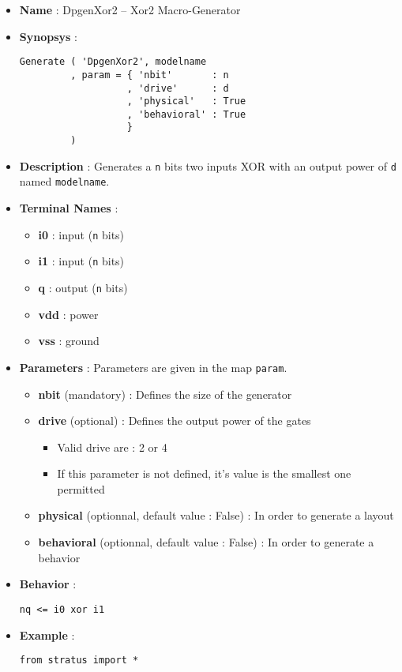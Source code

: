 \begin{itemize}
    \item \textbf{Name} : DpgenXor2 -- Xor2 Macro-Generator
    \item \textbf{Synopsys} :
\begin{verbatim}
Generate ( 'DpgenXor2', modelname
         , param = { 'nbit'       : n
                   , 'drive'      : d
                   , 'physical'   : True
                   , 'behavioral' : True                   
                   }
         )
\end{verbatim}
    \item \textbf{Description} : Generates a \verb-n- bits two inputs XOR with an output power of \verb-d- named \verb-modelname-.
    \item \textbf{Terminal Names} :
    \begin{itemize}
        \item \textbf{i0} : input (\verb-n- bits)
        \item \textbf{i1} : input (\verb-n- bits)
        \item \textbf{q} : output (\verb-n- bits)
        \item \textbf{vdd} : power
        \item \textbf{vss} : ground
    \end{itemize}
    \item \textbf{Parameters} : Parameters are given in the map \verb-param-.
    \begin{itemize}
        \item \textbf{nbit} (mandatory) : Defines the size of the generator
        \item \textbf{drive} (optional) : Defines the output power of the gates
        \begin{itemize}
            \item Valid drive are : 2 or 4
            \item If this parameter is not defined, it's value is the smallest one permitted
        \end{itemize}
        \item \textbf{physical} (optionnal, default value : False) : In order to generate a layout
        \item \textbf{behavioral} (optionnal, default value : False) : In order to generate a behavior        
    \end{itemize}
    \item \textbf{Behavior} :
\begin{verbatim}
nq <= i0 xor i1
\end{verbatim}
    \item \textbf{Example} :
\begin{verbatim}
from stratus import *


\end{verbatim}
\end{itemize}
